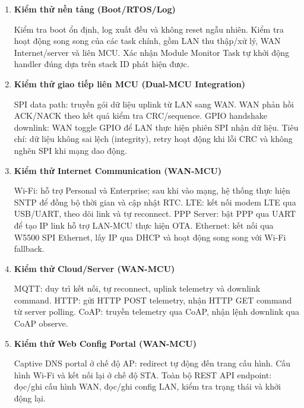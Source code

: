         \begin{enumerate}
            \renewcommand{\labelenumi}{\alph{enumi}.}

            \item \textbf{Kiểm thử nền tảng (Boot/RTOS/Log)}
        
            Kiểm tra boot ổn định, log xuất đều và không reset ngẫu nhiên. Kiểm tra hoạt động song song của các task chính, gồm LAN thu thập/xử lý, WAN Internet/server và liên MCU. Xác nhận Module Monitor Task tự khởi động handler đúng dựa trên stack ID phát hiện được.
        
            \item \textbf{Kiểm thử giao tiếp liên MCU (Dual-MCU Integration)}
        
            SPI data path: truyền gói dữ liệu uplink từ LAN sang WAN. WAN phản hồi ACK/NACK theo kết quả kiểm tra CRC/sequence. GPIO handshake downlink: WAN toggle GPIO để LAN thực hiện phiên SPI nhận dữ liệu. Tiêu chí: dữ liệu không sai lệch (integrity), retry hoạt động khi lỗi CRC và không nghẽn SPI khi mạng dao động.
        
            \item \textbf{Kiểm thử Internet Communication (WAN-MCU)}
        
            Wi-Fi: hỗ trợ Personal và Enterprise; sau khi vào mạng, hệ thống thực hiện SNTP để đồng bộ thời gian và cập nhật RTC. LTE: kết nối modem LTE qua USB/UART, theo dõi link và tự reconnect. PPP Server: bật PPP qua UART để tạo IP link hỗ trợ LAN-MCU thực hiện OTA. Ethernet: kết nối qua W5500 SPI Ethernet, lấy IP qua DHCP và hoạt động song song với Wi-Fi fallback.
        
            \item \textbf{Kiểm thử Cloud/Server (WAN-MCU)}
        
            MQTT: duy trì kết nối, tự reconnect, uplink telemetry và downlink command. HTTP: gửi HTTP POST telemetry, nhận HTTP GET command từ server polling. CoAP: truyền telemetry qua CoAP, nhận lệnh downlink qua CoAP observe.
        
            \item \textbf{Kiểm thử Web Config Portal (WAN-MCU)}
        
            Captive DNS portal ở chế độ AP: redirect tự động đến trang cấu hình. Cấu hình Wi-Fi và kết nối lại ở chế độ STA. Toàn bộ REST API endpoint: đọc/ghi cấu hình WAN, đọc/ghi config LAN, kiểm tra trạng thái và khởi động lại.
        

\end{enumerate}
